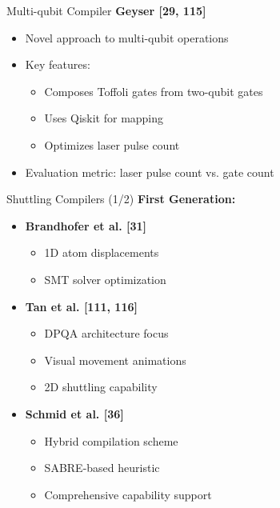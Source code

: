 \documentclass{beamer}
\begin{document}
\begin{frame}{Multi-qubit Compiler}
    \textbf{Geyser [29, 115]}
    \begin{itemize}
        \item Novel approach to multi-qubit operations
        \item Key features:
        \begin{itemize}
            \item Composes Toffoli gates from two-qubit gates
            \item Uses Qiskit for mapping
            \item Optimizes laser pulse count
        \end{itemize}
        \item Evaluation metric: laser pulse count vs. gate count
    \end{itemize}
\end{frame}

\begin{frame}{Shuttling Compilers (1/2)}
    \textbf{First Generation:}
    \begin{itemize}
        \item \textbf{Brandhofer et al. [31]}
        \begin{itemize}
            \item 1D atom displacements
            \item SMT solver optimization
        \end{itemize}
        \item \textbf{Tan et al. [111, 116]}
        \begin{itemize}
            \item DPQA architecture focus
            \item Visual movement animations
            \item 2D shuttling capability
        \end{itemize}
        \item \textbf{Schmid et al. [36]}
        \begin{itemize}
            \item Hybrid compilation scheme
            \item SABRE-based heuristic
            \item Comprehensive capability support
        \end{itemize}
    \end{itemize}
\end{frame}
\end{document}
